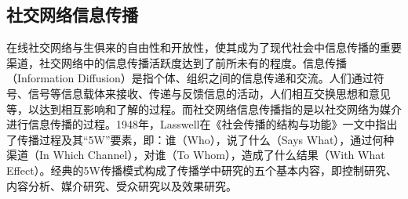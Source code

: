 
\subsection{社交网络信息传播}
\label{subsec1:informationDiffusion}
在线社交网络与生俱来的自由性和开放性，使其成为了现代社会中信息传播的重要渠道，社交网络中的信息传播活跃度达到了前所未有的程度。信息传播（Information Diffusion）是指个体、组织之间的信息传递和交流。人们通过符号、信号等信息载体来接收、传递与反馈信息的活动，人们相互交换思想和意见等，以达到相互影响和了解的过程。而社交网络信息传播指的是以社交网络为媒介进行信息传播的过程。1948年，Lasswell在《社会传播的结构与功能》一文中指出了传播过程及其“5W”要素，即：谁（Who），说了什么（Says What），通过何种渠道（In Which Channel），对谁（To Whom），造成了什么结果（With What Effect）。经典的5W传播模式构成了传播学中研究的五个基本内容，即控制研究、内容分析、媒介研究、受众研究以及效果研究。

